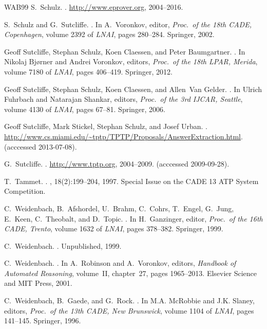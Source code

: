 \documentclass{report}
\begin{document}
\begin{thebibliography}{WAB{\etalchar{+}}99}
S.~Schulz.
.
\newblock \url{http://www.eprover.org}, 2004--2016.

S.~Schulz and G.~Sutcliffe.
.
\newblock In A.~Voronkov, editor, {\em Proc.\ of the 18th CADE, Copenhagen},
  volume 2392 of {\em LNAI}, pages 280--284. Springer, 2002.

Geoff Sutcliffe, Stephan Schulz, Koen Claessen, and Peter Baumgartner.
.
\newblock In Nikolaj Bj{\o}rner and Andrei Voronkov, editors, {\em Proc.\ of
  the 18th LPAR, Merida}, volume 7180 of {\em LNAI}, pages 406--419. Springer,
  2012.

Geoff Sutcliffe, Stephan Schulz, Koen Claessen, and Allen~Van Gelder.
.
\newblock In Ulrich Fuhrbach and Natarajan Shankar, editors, {\em Proc.\ of the
  3rd IJCAR, Seattle}, volume 4130 of {\em LNAI}, pages 67--81. Springer, 2006.

Geoff Sutcliffe, Mark Stickel, Stephan Schulz, and Josef Urban.
.
\newblock
  \url{http://www.cs.miami.edu/~tptp/TPTP/Proposals/AnswerExtraction.html}.
\newblock (acccessed 2013-07-08).

G.~Sutcliffe.
.
\newblock \url{http://www.tptp.org}, 2004--2009.
\newblock (acccessed 2009-09-28).

T.~Tammet.
.
, 18(2):199--204, 1997.
\newblock Special Issue on the CADE 13 ATP System Competition.

C.~Weidenbach, B.~Afshordel, U.~Brahm, C.~Cohrs, T.~Engel, G.~Jung, E.~Keen,
  C.~Theobalt, and D.~Topic.
.
\newblock In H.~Ganzinger, editor, {\em Proc.\ of the 16th CADE, Trento},
  volume 1632 of {\em LNAI}, pages 378--382. Springer, 1999.

C.~Weidenbach.
.
\newblock Unpublished, 1999.

C.~Weidenbach.
.
\newblock In A.~Robinson and A.~Voronkov, editors, {\em Handbook of Automated
  Reasoning}, volume~II, chapter~27, pages 1965--2013. Elsevier Science and MIT
  Press, 2001.

C.~Weidenbach, B.~Gaede, and G.~Rock.
.
\newblock In M.A. McRobbie and J.K. Slaney, editors, {\em Proc.\ of the 13th
  CADE, New Brunswick}, volume 1104 of {\em LNAI}, pages 141--145. Springer,
  1996.

\end{thebibliography}

\printindex
\end{document}
